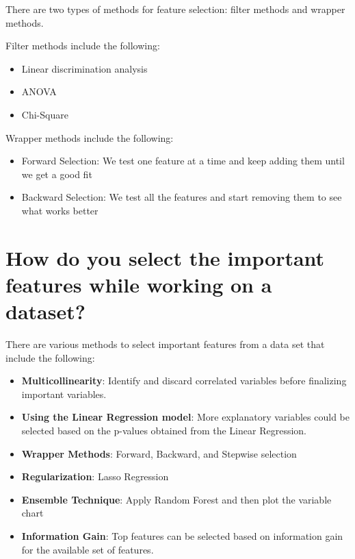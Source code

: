 \documentclass[
]{book}
\begin{document}
There are two types of methods for feature selection: filter methods and wrapper methods.

Filter methods include the following:

\begin{itemize}
\item
  Linear discrimination analysis
\item
  ANOVA
\item
  Chi-Square
\end{itemize}

Wrapper methods include the following:

\begin{itemize}
\item
  Forward Selection: We test one feature at a time and keep adding them until we get a good fit
\item
  Backward Selection: We test all the features and start removing them to see what works better
\end{itemize}

\hypertarget{how-do-you-select-the-important-features-while-working-on-a-dataset}{%
\section{How do you select the important features while working on a dataset?}\label{how-do-you-select-the-important-features-while-working-on-a-dataset}}

There are various methods to select important features from a data set that include the following:

\begin{itemize}
\item
  \textbf{Multicollinearity}: Identify and discard correlated variables before finalizing important variables.
\item
  \textbf{Using the Linear Regression model}: More explanatory variables could be selected based on the p-values obtained from the Linear Regression.
\item
  \textbf{Wrapper Methods}: Forward, Backward, and Stepwise selection
\item
  \textbf{Regularization}: Lasso Regression
\item
  \textbf{Ensemble Technique}: Apply Random Forest and then plot the variable chart
\item
  \textbf{Information Gain}: Top features can be selected based on information gain for the available set of features.
\end{itemize}
\end{document}
